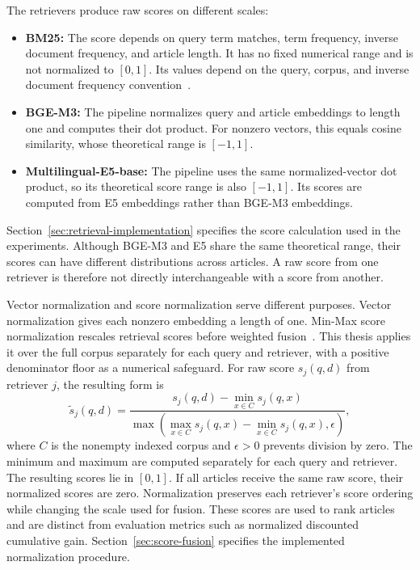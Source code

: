 The retrievers produce raw scores on different scales:
\begin{itemize}
    \item \textbf{BM25:} The score depends on query term matches, term frequency, inverse document frequency, and article length. It has no fixed numerical range and is not normalized to \([0,1]\). Its values depend on the query, corpus, and inverse document frequency convention~\cite{robertson2009}.
    \item \textbf{BGE-M3:} The pipeline normalizes query and article embeddings to length one and computes their dot product. For nonzero vectors, this equals cosine similarity, whose theoretical range is \([-1,1]\).
    \item \textbf{Multilingual-E5-base:} The pipeline uses the same normalized-vector dot product, so its theoretical score range is also \([-1,1]\). Its scores are computed from E5 embeddings rather than BGE-M3 embeddings.
\end{itemize}
Section~\ref{sec:retrieval-implementation} specifies the score calculation used in the experiments. Although BGE-M3 and E5 share the same theoretical range, their scores can have different distributions across articles. A raw score from one retriever is therefore not directly interchangeable with a score from another.

Vector normalization and score normalization serve different purposes. Vector normalization gives each nonzero embedding a length of one. Min-Max score normalization rescales retrieval scores before weighted fusion~\cite{bruch2022}. This thesis applies it over the full corpus separately for each query and retriever, with a positive denominator floor as a numerical safeguard. For raw score \(s_j(q,d)\) from retriever \(j\), the resulting form is
\[
\widetilde{s}_j(q,d)=
\frac{s_j(q,d)-\min_{x\in C}s_j(q,x)}
{\max\left(\max_{x\in C}s_j(q,x)-\min_{x\in C}s_j(q,x),\epsilon\right)},
\]
where \(C\) is the nonempty indexed corpus and \(\epsilon>0\) prevents division by zero. The minimum and maximum are computed separately for each query and retriever. The resulting scores lie in \([0,1]\). If all articles receive the same raw score, their normalized scores are zero. Normalization preserves each retriever's score ordering while changing the scale used for fusion. These scores are used to rank articles and are distinct from evaluation metrics such as normalized discounted cumulative gain. Section~\ref{sec:score-fusion} specifies the implemented normalization procedure.

